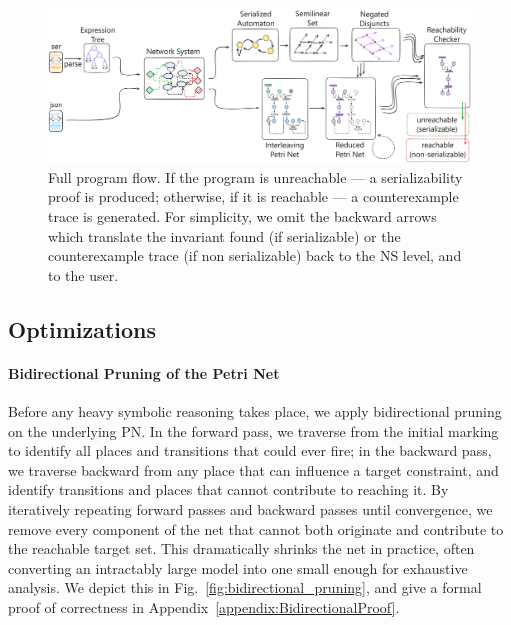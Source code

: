 \begin{figure}[htbp]
	\centering
	\includegraphics[width=1.0\textwidth]{plots/full_program_flow.pdf}
	\caption{Full program flow. If the program is unreachable --- a serializability proof is produced; otherwise, if it is reachable --- a counterexample trace is generated.
	For simplicity, we omit the backward arrows which translate the invariant found (if serializable) or the counterexample trace (if non serializable) back to the NS level, and to the user.}
	\label{fig:full_program_flow}
\end{figure}


\subsection{Optimizations}

\paragraph{Bidirectional Pruning of the Petri Net}
Before any heavy symbolic reasoning takes place, we apply bidirectional pruning on the underlying PN.  In the forward pass, we traverse from the initial marking to identify all places and transitions that could ever fire; in the backward pass, we traverse backward from any place that can influence a target constraint, and identify transitions and places that cannot contribute to reaching it.  By iteratively repeating forward passes and backward passes until convergence, we remove every component of the net that cannot both originate and contribute to the reachable target set.  This dramatically shrinks the net in practice, often converting an intractably large model into one small enough for exhaustive analysis.
%
We depict this in Fig.~\ref{fig:bidirectional_pruning}, and give a formal proof of correctness in Appendix~\ref{appendix:BidirectionalProof}.

